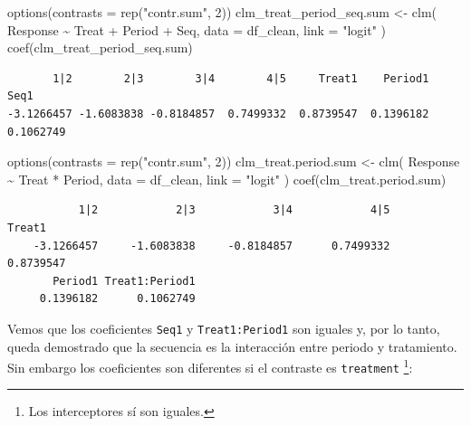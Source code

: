\documentclass[
  12pt,
  a4paper,
  extrafontsizes,
  onecolumn,
  openright]{memoir}
\newenvironment{Shaded}{\begin{snugshade}}{\end{snugshade}}
\newcommand{\AttributeTok}[1]{\textcolor[rgb]{0.40,0.45,0.13}{#1}}
\newcommand{\DecValTok}[1]{\textcolor[rgb]{0.68,0.00,0.00}{#1}}
\newcommand{\FunctionTok}[1]{\textcolor[rgb]{0.28,0.35,0.67}{#1}}
\newcommand{\NormalTok}[1]{\textcolor[rgb]{0.00,0.23,0.31}{#1}}
\newcommand{\OtherTok}[1]{\textcolor[rgb]{0.00,0.23,0.31}{#1}}
\newcommand{\SpecialCharTok}[1]{\textcolor[rgb]{0.37,0.37,0.37}{#1}}
\newcommand{\StringTok}[1]{\textcolor[rgb]{0.13,0.47,0.30}{#1}}
\begin{document}
\scriptsize

\begin{Shaded}
\begin{Highlighting}[]
\FunctionTok{options}\NormalTok{(}\AttributeTok{contrasts =} \FunctionTok{rep}\NormalTok{(}\StringTok{"contr.sum"}\NormalTok{, }\DecValTok{2}\NormalTok{))}
\NormalTok{clm\_treat\_period\_seq.sum }\OtherTok{\textless{}{-}}
    \FunctionTok{clm}\NormalTok{(}
\NormalTok{        Response }\SpecialCharTok{\textasciitilde{}}\NormalTok{ Treat }\SpecialCharTok{+}\NormalTok{ Period }\SpecialCharTok{+}\NormalTok{ Seq,}
        \AttributeTok{data =}\NormalTok{ df\_clean, }\AttributeTok{link =} \StringTok{"logit"}
\NormalTok{    )}
\FunctionTok{coef}\NormalTok{(clm\_treat\_period\_seq.sum)}
\end{Highlighting}
\end{Shaded}

\begin{verbatim}
       1|2        2|3        3|4        4|5     Treat1    Period1       Seq1 
-3.1266457 -1.6083838 -0.8184857  0.7499332  0.8739547  0.1396182  0.1062749 
\end{verbatim}

\begin{Shaded}
\begin{Highlighting}[]
\FunctionTok{options}\NormalTok{(}\AttributeTok{contrasts =} \FunctionTok{rep}\NormalTok{(}\StringTok{"contr.sum"}\NormalTok{, }\DecValTok{2}\NormalTok{))}
\NormalTok{clm\_treat.period.sum }\OtherTok{\textless{}{-}}
    \FunctionTok{clm}\NormalTok{(}
\NormalTok{        Response }\SpecialCharTok{\textasciitilde{}}\NormalTok{ Treat }\SpecialCharTok{*}\NormalTok{ Period,}
        \AttributeTok{data =}\NormalTok{ df\_clean, }\AttributeTok{link =} \StringTok{"logit"}
\NormalTok{    )}
\FunctionTok{coef}\NormalTok{(clm\_treat.period.sum)}
\end{Highlighting}
\end{Shaded}

\begin{verbatim}
           1|2            2|3            3|4            4|5         Treat1 
    -3.1266457     -1.6083838     -0.8184857      0.7499332      0.8739547 
       Period1 Treat1:Period1 
     0.1396182      0.1062749 
\end{verbatim}

\normalsize

Vemos que los coeficientes \texttt{Seq1} y \texttt{Treat1:Period1} son
iguales y, por lo tanto, queda demostrado que la secuencia es la
interacción entre periodo y tratamiento. Sin embargo los coeficientes
son diferentes si el contraste es \texttt{treatment} \footnote{Los
  interceptores sí son iguales.}:
\end{document}
